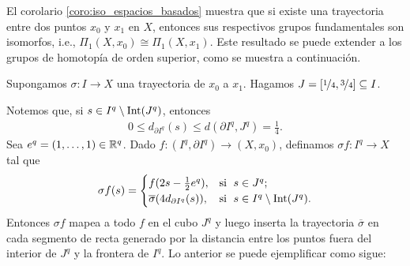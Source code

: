 
El corolario \ref{coro:iso_espacios_basados} muestra que si existe una trayectoria entre dos puntos $x_0$ y $x_1$ en $X$, entonces sus respectivos grupos fundamentales son isomorfos, i.e., $\Pi_1(X,x_0)\cong \Pi_1(X,x_1)$. Este resultado se puede extender a los grupos de homotopía de orden superior, como se muestra a continuación.

Supongamos  $\sigma:I\to X$ una trayectoria de $x_0$ a $x_1$. Hagamos $J=[\nicefrac{1}{4},\nicefrac{3}{4}]\subseteq I$. 

Notemos que, si $s\in I^q\setminus \mathrm{Int}(J^q)$, entonces
    \begin{equation*}
        \begin{split}
            0\leq d_{\partial I^q}(s)\leq d(\partial I^q,J^q)=\frac{1}{4}.
        \end{split}
    \end{equation*}
    Sea $e^q=(1,\ldots,1)\in \mathbb{R}^q$. Dado $f:(I^q,\partial I^q)\to(X,x_0)$, definamos $\sigma f:I^q\to X$ tal que
    \begin{equation*}
         \sigma f(s)=
         \begin{cases}
         f(2s-\frac{1}{2}e^q), & \text{si \;} s\in J^q;\\
         \overline{\sigma}(4d_{\partial I^q}(s)), & \text{si \;} s\in I^q\setminus\mathrm{Int}(J^q).\\
        \end{cases}
    \end{equation*}
    Entonces $\sigma f$ mapea a todo $f$ en el cubo $J^q$ y luego inserta la trayectoria $\overline{\sigma}$ en cada segmento de recta generado por la distancia entre los puntos fuera del interior de $J^q$ y la frontera de $I^q$. Lo anterior se puede ejemplificar como sigue:
